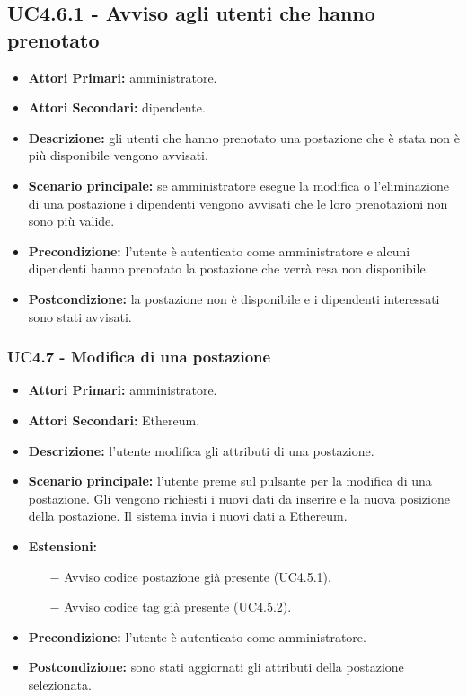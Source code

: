 \subsection{ UC4.6.1 - Avviso agli utenti che hanno prenotato}
\begin{itemize}
	\item\textbf{Attori Primari:}
	amministratore.
	\item\textbf{Attori Secondari:}
	dipendente.
	\item\textbf{Descrizione:}
	gli utenti che hanno prenotato una postazione che è stata non è più disponibile vengono avvisati.
	\item\textbf{Scenario principale:}
	se amministratore esegue la modifica o l'eliminazione di una postazione i dipendenti vengono avvisati che le loro prenotazioni non sono più valide.
	\item\textbf{Precondizione:}
	l'utente è autenticato come amministratore e alcuni dipendenti hanno prenotato la postazione che verrà resa non disponibile.
	\item\textbf{Postcondizione:}
	la postazione non è disponibile e i dipendenti interessati sono stati avvisati.
\end{itemize}

\subsubsection{ UC4.7 - Modifica di una postazione}
\begin{itemize}
	\item\textbf{Attori Primari:}
	amministratore.
	\item\textbf{Attori Secondari:}
	Ethereum.
	\item\textbf{Descrizione:}
	l'utente modifica gli attributi di una postazione.
	\item\textbf{Scenario principale:} 
	l'utente preme sul pulsante per la modifica di una postazione. Gli vengono richiesti i nuovi dati da inserire e la nuova posizione della postazione. Il sistema invia i nuovi dati a Ethereum.
	\item\textbf{Estensioni:}
	\begin{itemize}
		\item[$-$] Avviso codice postazione già presente (UC4.5.1).
		\item[$-$] Avviso codice tag già presente (UC4.5.2).
	\end{itemize}
	\item\textbf{Precondizione:} 
	l'utente è autenticato come amministratore.
	\item\textbf{Postcondizione:}
	sono stati aggiornati gli attributi della postazione selezionata.
\end{itemize}

